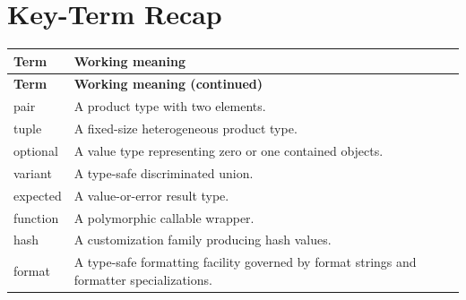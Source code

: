 \documentclass[11pt,letterpaper]{article}
\begin{document}
\section{Key-Term Recap}
\begin{longtable}{@{}>{\RaggedRight\arraybackslash}p{}>{\RaggedRight\arraybackslash}p{}@{}}\toprule\textbf{Term} & \textbf{Working meaning}\\\midrule\endfirsthead\toprule\textbf{Term} & \textbf{Working meaning (continued)}\\\midrule\endhead\bottomrule\endfoot
pair & A product type with two elements.\\
tuple & A fixed-size heterogeneous product type.\\
optional & A value type representing zero or one contained objects.\\
variant & A type-safe discriminated union.\\
expected & A value-or-error result type.\\
function & A polymorphic callable wrapper.\\
hash & A customization family producing hash values.\\
format & A type-safe formatting facility governed by format strings and formatter specializations.\\
\end{longtable}
\end{document}
